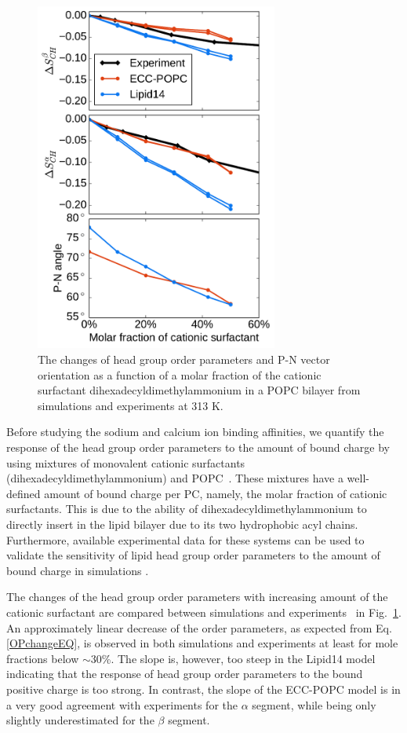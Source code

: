 \begin{figure}[tb!] 
  \centering 
  \includegraphics[width=8.0cm]{../img/ecc_popc/PN_angle_OrdPars-A-B_L14-ECCL17_q80_sig89_surf.pdf} 
  \caption{\label{OrderParameterCHANGESsurf} 
    The changes of head group order parameters and P-N vector orientation as a function of 
    a molar fraction of the cationic surfactant dihexadecyldimethylammonium in a POPC bilayer 
    from simulations and experiments \citep{scherer89} at 313 K.
  } 
\end{figure} 
 
Before studying the sodium and calcium ion binding affinities, we quantify the response of the head group order parameters to the amount of bound charge by using mixtures of monovalent cationic surfactants (dihexadecyldimethylammonium) and POPC~\citep{scherer89}. These mixtures have a well-defined amount of bound charge per PC, namely, the molar fraction of cationic surfactants. This is due to the ability of dihexadecyldimethylammonium to directly insert in the lipid bilayer due to its two hydrophobic acyl chains. Furthermore, available experimental data for these systems can be used to validate the sensitivity of lipid head group order parameters to the amount of bound charge in simulations \citep{scherer89}. 
 
The changes of the head group order parameters with increasing amount of the cationic surfactant are compared between simulations and experiments~\citep{scherer89} in Fig.~\ref{OrderParameterCHANGESsurf}. An approximately linear decrease of the order parameters, as expected from Eq. \ref{OPchangeEQ}, is observed in both simulations and experiments at least for mole fractions below $\sim$30\%. The slope is, however, too steep in the Lipid14 model indicating that the response of head group order parameters to the bound positive charge is too strong. In contrast, the slope of the ECC-POPC model is in a very good agreement with experiments for the $\alpha$ segment, while being only slightly underestimated for the $\beta$ segment. 
 

